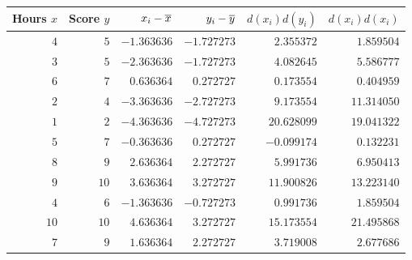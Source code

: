 \begin{tabular}{rrrrrr}                                                                  \toprule
Hours $x$ & Score $y$ & $x_i - \overline{x}$ & $y_i - \overline{y}$ & $d(x_i)d(y_i)$ & $d(x_i)d(x_i)$ \\\midrule
$4$       & $5$       & $-1.363636$   & $-1.727273$   & $2.355372$    & $1.859504$     \\
$3$       & $5$       & $-2.363636$   & $-1.727273$   & $4.082645$    & $5.586777$     \\
$6$       & $7$       & $0.636364$    & $0.272727$    & $0.173554$    & $0.404959$     \\
$2$       & $4$       & $-3.363636$   & $-2.727273$   & $9.173554$    & $11.314050$    \\
$1$       & $2$       & $-4.363636$   & $-4.727273$   & $20.628099$   & $19.041322$    \\
$5$       & $7$       & $-0.363636$   & $0.272727$    & $-0.099174$   & $0.132231$     \\
$8$       & $9$       & $2.636364$    & $2.272727$    & $5.991736$    & $6.950413$     \\
$9$       & $10$      & $3.636364$    & $3.272727$    & $11.900826$   & $13.223140$    \\
$4$       & $6$       & $-1.363636$   & $-0.727273$   & $0.991736$    & $1.859504$     \\
$10$      & $10$      & $4.636364$    & $3.272727$    & $15.173554$   & $21.495868$    \\
$7$       & $9$       & $1.636364$    & $2.272727$    & $3.719008$    & $2.677686$     \\\bottomrule
\end{tabular}
